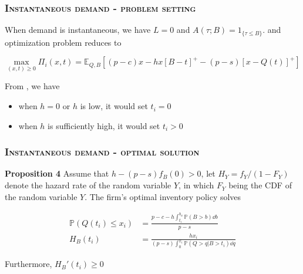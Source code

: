 \documentclass[aspectratio=169]{../presentation}
\begin{document}
    \begin{frame}
        \frametitle{\textsc{Instantaneous demand - problem setting}}

        When demand is instantaneous, we have $L = 0$ and $A(\tau; B) = 1_{\{\tau\leq B\}}$. and optimization problem reduces to 

        \begin{equation}
            \max_{(x, t)\geq 0}\Pi_{i}(x, t) = \mathbb E_{Q, B}\left[(p-c)x - hx\left[B-t\right]^+ - (p-s)\left[x - Q(t)\right]^+\right]
            \label{eq:6}
        \end{equation}

        From , we have

        \begin{itemize}
            \item when $h = 0$ or $h$ is low, it would set $t_i = 0$
            \item when $h$ is sufficiently high, it would set $t_i > 0$
        \end{itemize}

    \end{frame}

    \begin{frame}
        \frametitle{\textsc{Instantaneous demand - optimal solution}}

        \textrm{\bfseries Proposition 4} Assume that $h - (p-s)f_B(0) > 0$, let $H_Y = f_Y / (1 - F_Y)$ denote the hazard rate of the random variable $Y$, in which $F_Y$ being the CDF of the random variable $Y$. The firm's optimal inventory policy solves

        \begin{align}
            \mathbb P\left(Q\left(t_i\right)\leq x_i\right) &= \frac{p - c - h\int_{t_i}^{b_u} \mathbb P(B>b)\dd b}{p - s} \\
            H_B\left(t_i\right) &= \frac{hx_i}{(p-s)\int_{0}^{x_i}\mathbb P(Q > q|B > t_i)\dd q}
        \end{align}

        Furthermore, $H_B'\left(t_i\right)\geq 0$

    \end{frame}
\end{document}
